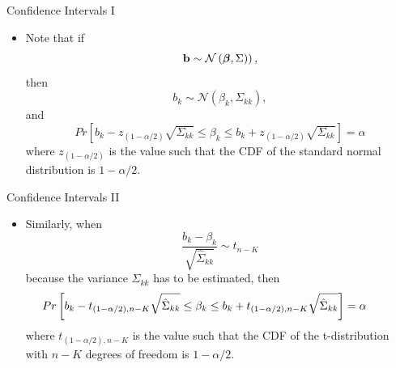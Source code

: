 


\begin{frame}{Confidence Intervals I}
\begin{itemize}
	\item Note that if 	\[
		{\bf b} \sim\mathcal{N}\left(\boldsymbol{\beta},\Sigma)\right),
	\]
	then \[
		b_{k} \sim\mathcal{N}\left(\beta_k,\Sigma_{kk}\right),	
	\]
	and \[
	Pr\left[ b_{k} - z_{\left(1-\alpha/2\right)} \sqrt{\Sigma_{kk}} \le \beta_k \le b_k +  z_{\left(1-\alpha/2\right)}  \sqrt{\Sigma_{kk}}  \right] =\alpha 
	\]
	where $ z_{\left(1-\alpha/2\right)} $ is the value such that the CDF of the standard normal distribution is $1-\alpha/2$. 	

\end{itemize}
\end{frame}




\begin{frame}{Confidence Intervals II}
\begin{itemize}
	\item Similarly, when \[
		\frac{b_k - \beta_k}{\sqrt{\hat{\Sigma}_{kk}}} \sim t_{n-K}
	\]
	because the variance $\Sigma_{kk}$ has to be estimated, then
 \[
	\hspace*{-1cm} Pr\left[ b_{k} - t_{\left(1-\alpha/2\right),n-K} \sqrt{\hat{\Sigma}_{kk}} \le \beta_k \le b_k +  t_{\left(1-\alpha/2\right),n-K}  \sqrt{\hat{\Sigma}_{kk}}  \right] =\alpha 
	\]
	where $ t_{\left(1-\alpha/2\right),n-K} $ is the value such that the CDF of the t-distribution with $n-K$ degrees of freedom is $1-\alpha/2$. 	

\end{itemize}
\end{frame}



